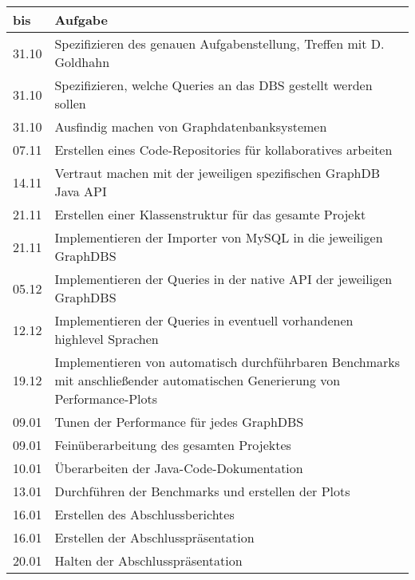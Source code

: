 \documentclass[11pt, a4paper, oneside]{article} %
\begin{document}
\begin{table}
\begin{tabular}{|p{1cm}|p{12cm}|}
\hline \textbf{bis} & \textbf{ Aufgabe} \\ 
\hline 31.10 & Spezifizieren des genauen Aufgabenstellung, Treffen mit D. Goldhahn \\ 
\hline 31.10 & Spezifizieren, welche Queries an das DBS gestellt werden sollen \\ 
\hline 31.10 & Ausfindig machen von Graphdatenbanksystemen \\ 
\hline 07.11 & Erstellen eines Code-Repositories für kollaboratives arbeiten \\ 
\hline 14.11 & Vertraut machen mit der jeweiligen spezifischen GraphDB Java API \\ 
\hline 21.11 & Erstellen einer Klassenstruktur für das gesamte Projekt \\ 
\hline 21.11 & Implementieren der Importer von MySQL in die jeweiligen GraphDBS  \\ 
\hline 05.12 & Implementieren der Queries in der native API der jeweiligen GraphDBS \\ 
\hline 12.12 & Implementieren der Queries in eventuell vorhandenen highlevel Sprachen \\ 
\hline 19.12 & Implementieren von automatisch durchführbaren Benchmarks mit anschließender automatischen Generierung von  Performance-Plots \\ 
\hline 09.01 & Tunen der Performance für jedes GraphDBS \\ 
\hline 09.01 & Feinüberarbeitung des gesamten Projektes \\ 
\hline 10.01 & Überarbeiten der Java-Code-Dokumentation  \\ 
\hline 13.01 & Durchführen der Benchmarks und erstellen der Plots \\ 
\hline 16.01 & Erstellen des Abschlussberichtes \\ 
\hline 16.01 & Erstellen der Abschlusspräsentation \\ 
\hline 20.01 & Halten der Abschlusspräsentation \\ 
\hline
\end{tabular}
\end{table}
\end{document}

